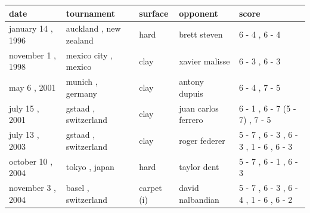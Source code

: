 \documentclass{article}
\begin{document}
\begin{tabular}{lllll}
\toprule
date & tournament & surface & opponent & score \\
\midrule
january 14 , 1996 & auckland , new zealand & hard & brett steven & 6 - 4 , 6 - 4 \\
november 1 , 1998 & mexico city , mexico & clay & xavier malisse & 6 - 3 , 6 - 3 \\
may 6 , 2001 & munich , germany & clay & antony dupuis & 6 - 4 , 7 - 5 \\
july 15 , 2001 & gstaad , switzerland & clay & juan carlos ferrero & 6 - 1 , 6 - 7 (5 - 7) , 7 - 5 \\
july 13 , 2003 & gstaad , switzerland & clay & roger federer & 5 - 7 , 6 - 3 , 6 - 3 , 1 - 6 , 6 - 3 \\
october 10 , 2004 & tokyo , japan & hard & taylor dent & 5 - 7 , 6 - 1 , 6 - 3 \\
november 3 , 2004 & basel , switzerland & carpet (i) & david nalbandian & 5 - 7 , 6 - 3 , 6 - 4 , 1 - 6 , 6 - 2 \\
\bottomrule
\end{tabular}
\end{document}
